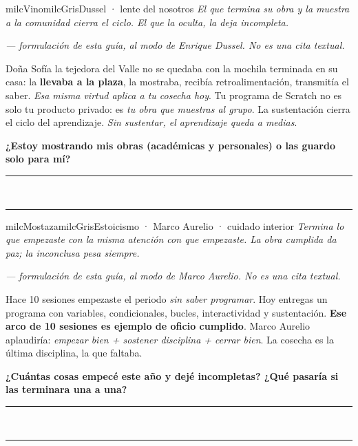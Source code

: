 \documentclass[11pt,letterpaper]{article}
\newcommand{\linead}[1]{\noindent\color{milcLinea}\rule{#1}{0.5pt}\color{milcNegro}}
\begin{document}
\begin{softbox}{milcVino}{milcGris}{Dussel · lente del nosotros}
\textit{El que termina su obra y la muestra a la comunidad cierra el ciclo. El que la oculta, la deja incompleta.}

{\footnotesize\itshape\color{milcNegro!70}--- formulación de esta guía, al modo de Enrique Dussel. No es una cita textual.}

Doña Sofía la tejedora del Valle no se quedaba con la mochila terminada en su casa: la \textbf{llevaba a la plaza}, la mostraba, recibía retroalimentación, transmitía el saber. \emph{Esa misma virtud aplica a tu cosecha hoy}. Tu programa de Scratch no es solo tu producto privado: es \emph{tu obra que muestras al grupo}. La sustentación cierra el ciclo del aprendizaje. \emph{Sin sustentar, el aprendizaje queda a medias}.

\textbf{¿Estoy mostrando mis obras (académicas y personales) o las guardo solo para mí?}
\end{softbox}
\linead{\linewidth}\\[1mm]
\linead{\linewidth}

\begin{softbox}{milcMostaza}{milcGris}{Estoicismo · Marco Aurelio · cuidado interior}
\textit{Termina lo que empezaste con la misma atención con que empezaste. La obra cumplida da paz; la inconclusa pesa siempre.}

{\footnotesize\itshape\color{milcNegro!70}--- formulación de esta guía, al modo de Marco Aurelio. No es una cita textual.}

Hace 10 sesiones empezaste el periodo \emph{sin saber programar}. Hoy entregas un programa con variables, condicionales, bucles, interactividad y sustentación. \textbf{Ese arco de 10 sesiones es ejemplo de oficio cumplido}. Marco Aurelio aplaudiría: \emph{empezar bien + sostener disciplina + cerrar bien}. La cosecha es la última disciplina, la que faltaba.

\textbf{¿Cuántas cosas empecé este año y dejé incompletas? ¿Qué pasaría si las terminara una a una?}
\end{softbox}
\linead{\linewidth}\\[1mm]
\linead{\linewidth}
\end{document}
